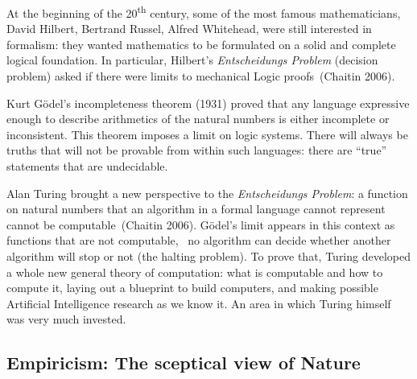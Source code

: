 \documentclass[
  letterpaper,
  12pt,
  british]{tufte-book}
\theoremstyle{plain}
\theoremstyle{definition}
\theoremstyle{plain}
\theoremstyle{remark}
\begin{document}
At the beginning of the 20\textsuperscript{th} century, some of the most
famous mathematicians, David Hilbert, Bertrand Russel, Alfred Whitehead,
were still interested in formalism: they wanted mathematics to be
formulated on a solid and complete logical foundation. In particular,
Hilbert's \emph{Entscheidungs Problem} (decision problem) asked if there
were limits to mechanical Logic proofs~(Chaitin
2006).

Kurt Gödel's incompleteness theorem (1931) proved that any language
expressive enough to describe arithmetics of the natural numbers is
either incomplete or inconsistent. This theorem imposes a limit on logic
systems. There will always be truths that will not be provable from
within such languages: there are ``true'' statements that are
undecidable.

Alan Turing brought a new perspective to the \emph{Entscheidungs
Problem}: a function on natural numbers that an algorithm in a formal
language cannot represent cannot be computable~(Chaitin
2006).
Gödel's limit appears in this context as functions that are not
computable, ~no algorithm can decide whether another algorithm will stop
or not (the halting problem). To prove that, Turing developed a whole
new general theory of computation: what is computable and how to compute
it, laying out a blueprint to build computers, and making possible
Artificial Intelligence research as we know it. An area in which Turing
himself was very much invested.

\hypertarget{sec-empiricism}{%
\subsection{Empiricism: The sceptical view of
Nature}\label{sec-empiricism}}
\end{document}
